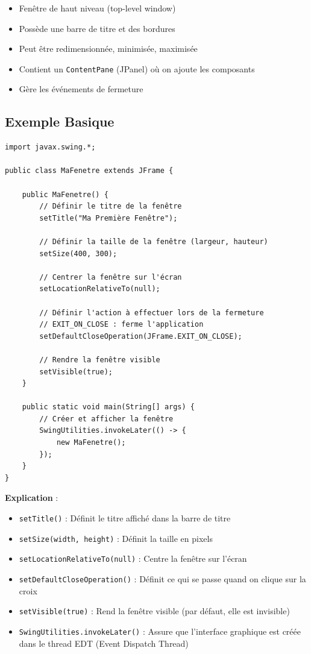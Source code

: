 \documentclass[11pt,a4paper]{article}
\begin{document}
\begin{itemize}
    \item Fenêtre de haut niveau (top-level window)
    \item Possède une barre de titre et des bordures
    \item Peut être redimensionnée, minimisée, maximisée
    \item Contient un \texttt{ContentPane} (JPanel) où on ajoute les composants
    \item Gère les événements de fermeture
\end{itemize}

\subsection{Exemple Basique}

\begin{lstlisting}
import javax.swing.*;

public class MaFenetre extends JFrame {
    
    public MaFenetre() {
        // Définir le titre de la fenêtre
        setTitle("Ma Première Fenêtre");
        
        // Définir la taille de la fenêtre (largeur, hauteur)
        setSize(400, 300);
        
        // Centrer la fenêtre sur l'écran
        setLocationRelativeTo(null);
        
        // Définir l'action à effectuer lors de la fermeture
        // EXIT_ON_CLOSE : ferme l'application
        setDefaultCloseOperation(JFrame.EXIT_ON_CLOSE);
        
        // Rendre la fenêtre visible
        setVisible(true);
    }
    
    public static void main(String[] args) {
        // Créer et afficher la fenêtre
        SwingUtilities.invokeLater(() -> {
            new MaFenetre();
        });
    }
}
\end{lstlisting}

\textbf{Explication} :
\begin{itemize}
    \item \texttt{setTitle()} : Définit le titre affiché dans la barre de titre
    \item \texttt{setSize(width, height)} : Définit la taille en pixels
    \item \texttt{setLocationRelativeTo(null)} : Centre la fenêtre sur l'écran
    \item \texttt{setDefaultCloseOperation()} : Définit ce qui se passe quand on clique sur la croix
    \item \texttt{setVisible(true)} : Rend la fenêtre visible (par défaut, elle est invisible)
    \item \texttt{SwingUtilities.invokeLater()} : Assure que l'interface graphique est créée dans le thread EDT (Event Dispatch Thread)
\end{itemize}
\end{document}
